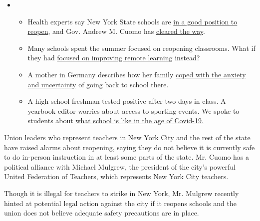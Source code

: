 \begin{itemize}
\item
  \begin{itemize}
  \tightlist
  \item
    Health experts say New York State schools are
    \href{https://www.nytimes.com/2020/08/07/health/coronavirus-ny-schools-reopen.html?action=click\&pgtype=Article\&state=default\&region=MAIN_CONTENT_2\&context=storylines_keepup}{in
    a good position to reopen}, and Gov. Andrew M. Cuomo has
    \href{https://www.nytimes.com/2020/08/07/nyregion/cuomo-schools-reopening.html?action=click\&pgtype=Article\&state=default\&region=MAIN_CONTENT_2\&context=storylines_keepup}{cleared
    the way}.
  \item
    Many schools spent the summer focused on reopening classrooms. What
    if they had
    \href{https://www.nytimes.com/2020/08/07/us/remote-learning-fall-2020.html?action=click\&pgtype=Article\&state=default\&region=MAIN_CONTENT_2\&context=storylines_keepup}{focused
    on improving remote learning} instead?
  \item
    A mother in Germany describes how her family
    \href{https://www.nytimes.com/2020/08/07/parenting/germany-schools-reopening-children.html?action=click\&pgtype=Article\&state=default\&region=MAIN_CONTENT_2\&context=storylines_keepup}{coped
    with the anxiety and uncertainty} of going back to school there.
  \item
    A high school freshman tested positive after two days in class. A
    yearbook editor worries about access to sporting events. We spoke to
    students about
    \href{https://www.nytimes.com/2020/08/06/us/coronavirus-students.html?action=click\&pgtype=Article\&state=default\&region=MAIN_CONTENT_2\&context=storylines_keepup}{what
    school is like in the age of Covid-19.}
  \end{itemize}
\end{itemize}

Union leaders who represent teachers in New York City and the rest of
the state have raised alarms about reopening, saying they do not believe
it is currently safe to do in-person instruction in at least some parts
of the state. Mr. Cuomo has a political alliance with Michael Mulgrew,
the president of the city's powerful United Federation of Teachers,
which represents New York City teachers.

Though it is illegal for teachers to strike in New York, Mr. Mulgrew
recently hinted at potential legal action against the city if it reopens
schools and the union does not believe adequate safety precautions are
in place.

